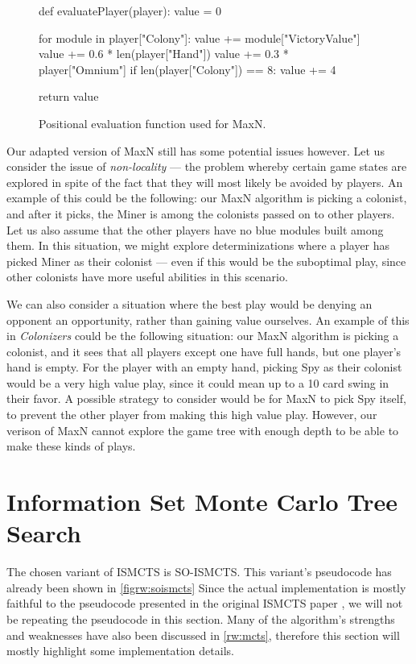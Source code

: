 \begin{figure}[hb]
\begin{code}[commandchars=\\\{\},codes={\catcode`\$=3\catcode`\^=7\catcode`\_=8}]
def evaluatePlayer(player):
    value = 0

    for module in player["Colony"]:
        value += module["VictoryValue"]
    value += 0.6 * len(player["Hand"])
    value += 0.3 * player["Omnium"]
    if len(player["Colony"]) == 8:
        value += 4

    return value
\end{code}
\caption{Positional evaluation function used for MaxN.}\label{algo:maxneval}
\end{figure}

Our adapted version of MaxN still has some potential issues however.
Let us consider the issue of \emph{non-locality} --- the problem whereby
certain game states are explored in spite of the fact that they will
most likely be avoided by players. An example of this could be the following:
our MaxN algorithm is picking a colonist, and after it picks, the Miner is among
the colonists passed on to other players. Let us also assume that the other players
have no blue modules built among them. In this situation,
we might explore determinizations where a player has picked Miner as their colonist
--- even if this would be the suboptimal play, since other colonists
have more useful abilities in this scenario.

We can also consider a situation where the best play would be denying an opponent
an opportunity, rather than gaining value ourselves. An example of this in
\emph{Colonizers} could be the following situation: our MaxN algorithm is picking
a colonist, and it sees that all players except one have full hands, but one
player's hand is empty. For the player with an empty hand, picking Spy as their
colonist would be a very high value play, since it could mean up to a 10 card swing
in their favor. A possible strategy to consider would be for MaxN to pick Spy itself,
to prevent the other player from making this high value play. However, our verison
of MaxN cannot explore the game tree with enough depth to be able to make these
kinds of plays.

\section{Information Set Monte Carlo Tree Search}

The chosen variant of ISMCTS is SO-ISMCTS. This variant's pseudocode
has already been shown in \autoref{figrw:soismcts} Since the actual
implementation is mostly faithful to the pseudocode presented in the original
ISMCTS paper \cite{Cowling12}, we will not be repeating the pseudocode in this section.
Many of the algorithm's strengths and weaknesses have also been discussed in
\autoref{rw:mcts}, therefore this section will mostly highlight some implementation
details.

